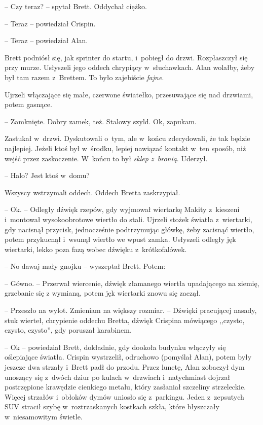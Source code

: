 \documentclass[oneside,polish,11pt,sfheadings]{mwbk}
\begin{document}
-- Czy teraz? -- spytał Brett. Oddychał ciężko.

-- Teraz -- powiedział Crispin.

-- Teraz -- powiedział Alan.

Brett podniósł się, jak sprinter do startu, i~pobiegł do drzwi.
Rozpłaszczył się przy murze. Usłyszeli jego oddech chrypiący w~słuchawkach. Alan wolałby, żeby był tam razem z~Brettem. To było
zajebiście \textit{fajne}.

Ujrzeli włączające się małe, czerwone światełko, przesuwające się nad
drzwiami, potem gasnące. 

-- Zamknięte. Dobry zamek, też. Stalowy szyld.
Ok, zapukam.

Zastukał w~drzwi. Dyskutowali o~tym, ale w~końcu zdecydowali, że tak
będzie najlepiej. Jeżeli ktoś był w~środku, lepiej nawiązać kontakt w~ten sposób, niż wejść przez zaskoczenie. W~końcu to był \textit{sklep z~bronią}. Uderzył. 

-- Halo? Jest ktoś w~domu?

Wszyscy wstrzymali oddech. Oddech Bretta zaskrzypiał. 

-- Ok. -- Odległy
dźwięk rzepów, gdy wyjmował wiertarkę Makity z~kieszeni i~montował
wysokoobrotowe wiertło do stali. Ujrzeli stożek światła z~wiertarki, gdy
nacisnął przycisk, jednocześnie podtrzymując główkę, żeby zacisnąć
wiertło, potem przykucnął i~wsunął wiertło we wpust zamka. Usłyszeli
odległy jęk wiertarki, lekko poza fazą wobec dźwięku z~krótkofalówek. 

-- No dawaj mały gnojku -- wyszeptał Brett. Potem: 

-- Gówno. -- Przerwał
wiercenie, dźwięk złamanego wiertła upadającego na ziemię, grzebanie się
z wymianą, potem jęk wiertarki znowu się zaczął.

-- Przeszło na wylot. Zmieniam na większy rozmiar. -- Dźwięki pracującej
nasady, stuk wierteł, chrypienie oddechu Bretta, dźwięk Crispina
mówiącego ,,czysto, czysto, czysto'', gdy poruszał karabinem.

-- Ok -- powiedział Brett, dokładnie, gdy dookoła budynku włączyły się
oślepiające światła. Crispin wystrzelił, odruchowo (pomyślał Alan),
potem były jeszcze dwa strzały i~Brett padł do przodu. Przez lunetę,
Alan zobaczył dym unoszący się z~dwóch dziur po kulach w~drzwiach i~natychmiast dojrzał postrzępione krawędzie cienkiego metalu, który
zasłaniał szczeliny strzeleckie. Więcej strzałów i~obłoków dymów uniosło
się z~parkingu. Jeden z~zepsutych SUV stracił szybę w~roztrzaskanych
kostkach szkła, które błyszczały w~niesamowitym świetle.
\end{document}
